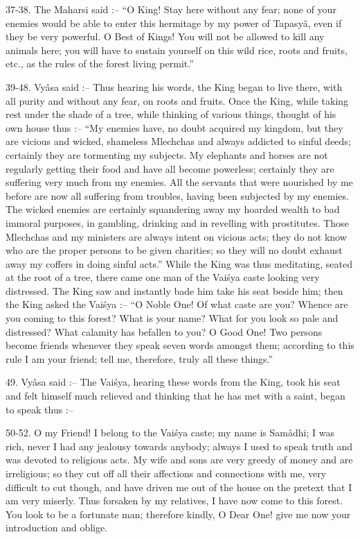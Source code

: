 37-38. The Maharsi said :-- ``O King! Stay here without any fear; none of your enemies would be able to enter this hermitage by my power of Tapasy\^a, even if they be very powerful. O Best of Kings! You will not be allowed to kill any animals here; you will have to sustain yourself on this wild rice, roots and fruits, etc., as the rules of the forest living permit.''

39-48. Vy\^asa said :-- Thus hearing his words, the King began to live there, with all purity and without any fear, on roots and fruits. Once the King, while taking rest under the shade of a tree, while thinking of various things, thought of his own house thus :-- ``My enemies have, no doubt acquired my kingdom, but they are vicious and wicked, shameless Mlechchas and always addicted to sinful deeds; certainly they are tormenting my subjects. My elephants and horses are not regularly getting their food and have all become powerless; certainly they are suffering very much from my enemies. All the servants that were nourished by me before are now all suffering from troubles, having been subjected by my enemies. The wicked enemies are certainly squandering away my hoarded wealth to bad immoral purposes, in gambling, drinking and in revelling with prostitutes. Those Mlechchas and my ministers are always intent on vicious acts; they do not know who are the proper persons to be given charities; so they will no doubt exhaust away my coffers in doing sinful acts.'' While the King was thus meditating, seated at the root of a tree, there came one man of the Vai\'sya caste looking very distressed. The King saw and instantly bade him take his seat beside him; then the King asked the Vai\'sya :-- ``O Noble One! Of what caste are you? Whence are you coming to this forest? What is your name? What for you look so pale and distressed? What calamity has befallen to you? O Good One! Two persons become friends whenever they speak seven words amongst them; according to this rule I am your friend; tell me, therefore, truly all these things.''

49. Vy\^asa said :-- The Vai\'sya, hearing these words from the King, took his seat and felt himself much relieved and thinking that he has met with a saint, began to speak thus :--

50-52. O my Friend! I belong to the Vai\'sya caste; my name is Sam\^adhi; I was rich, never I had any jealousy towards anybody; always I used to speak truth and was devoted to religious acts. My wife and sons are very greedy of money and are irreligious; so they cut off all their affections and connections with me, very difficult to cut though, and have driven me out of the house on the pretext that I am very miserly. Thus forsaken by my relatives, I have now come to this forest. You look to be a fortunate man; therefore kindly, O Dear One! give me now your introduction and oblige.

